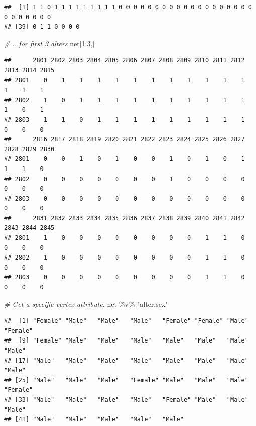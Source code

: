 \documentclass[
]{book}
\newenvironment{Shaded}{\begin{snugshade}}{\end{snugshade}}
\newcommand{\CommentTok}[1]{\textcolor[rgb]{0.56,0.35,0.01}{\textit{#1}}}
\newcommand{\DecValTok}[1]{\textcolor[rgb]{0.00,0.00,0.81}{#1}}
\newcommand{\NormalTok}[1]{#1}
\newcommand{\SpecialCharTok}[1]{\textcolor[rgb]{0.00,0.00,0.00}{#1}}
\newcommand{\StringTok}[1]{\textcolor[rgb]{0.31,0.60,0.02}{#1}}
\begin{document}
\begin{verbatim}
##  [1] 1 1 0 1 1 1 1 1 1 1 1 1 0 0 0 0 0 0 0 0 0 0 0 0 0 0 0 0 0 0 0 0 0 0 0 0 0 0
## [39] 0 1 1 0 0 0 0
\end{verbatim}

\begin{Shaded}
\begin{Highlighting}[]
\CommentTok{\# ...for first 3 alters}
\NormalTok{net[}\DecValTok{1}\SpecialCharTok{:}\DecValTok{3}\NormalTok{,]}
\end{Highlighting}
\end{Shaded}

\begin{verbatim}
##      2801 2802 2803 2804 2805 2806 2807 2808 2809 2810 2811 2812 2813 2814 2815
## 2801    0    1    1    1    1    1    1    1    1    1    1    1    1    1    1
## 2802    1    0    1    1    1    1    1    1    1    1    1    1    1    0    1
## 2803    1    1    0    1    1    1    1    1    1    1    1    1    0    0    0
##      2816 2817 2818 2819 2820 2821 2822 2823 2824 2825 2826 2827 2828 2829 2830
## 2801    0    0    1    0    1    0    0    1    0    1    0    1    1    1    0
## 2802    0    0    0    0    0    0    0    1    0    0    0    0    0    0    0
## 2803    0    0    0    0    0    0    0    0    0    0    0    0    0    0    0
##      2831 2832 2833 2834 2835 2836 2837 2838 2839 2840 2841 2842 2843 2844 2845
## 2801    1    0    0    0    0    0    0    0    0    1    1    0    0    0    0
## 2802    1    0    0    0    0    0    0    0    0    1    1    0    0    0    0
## 2803    0    0    0    0    0    0    0    0    0    1    1    0    0    0    0
\end{verbatim}

\begin{Shaded}
\begin{Highlighting}[]
\CommentTok{\# Get a specific vertex attribute.}
\NormalTok{net }\SpecialCharTok{\%v\%} \StringTok{"alter.sex"}
\end{Highlighting}
\end{Shaded}

\begin{verbatim}
##  [1] "Female" "Male"   "Male"   "Male"   "Female" "Female" "Male"   "Female"
##  [9] "Female" "Male"   "Male"   "Male"   "Male"   "Male"   "Male"   "Male"  
## [17] "Male"   "Male"   "Male"   "Male"   "Male"   "Male"   "Male"   "Male"  
## [25] "Male"   "Male"   "Male"   "Female" "Male"   "Male"   "Male"   "Female"
## [33] "Male"   "Male"   "Male"   "Male"   "Female" "Male"   "Male"   "Male"  
## [41] "Male"   "Male"   "Male"   "Male"   "Male"
\end{verbatim}
\end{document}
